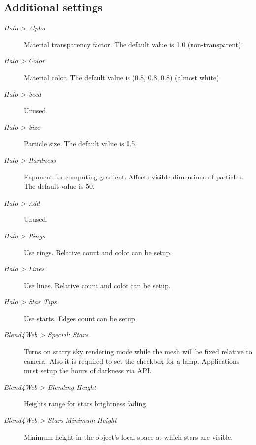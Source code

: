 \documentclass[a4paper,12pt,oneside]{sphinxmanual}
\begin{document}
\subsection{Additional settings}
\label{materials:id15}\begin{description}
\item[{\emph{Halo \textgreater{} Alpha}}] \leavevmode
Material transparency factor. The default value is 1.0 (non-transparent).

\item[{\emph{Halo \textgreater{} Color}}] \leavevmode
Material color. The default value is (0.8, 0.8, 0.8) (almost white).

\item[{\emph{Halo \textgreater{} Seed}}] \leavevmode
Unused.

\item[{\emph{Halo \textgreater{} Size}}] \leavevmode
Particle size. The default value is 0.5.

\item[{\emph{Halo \textgreater{} Hardness}}] \leavevmode
Exponent for computing gradient. Affects visible dimensions of particles. The default value is 50.

\item[{\emph{Halo \textgreater{} Add}}] \leavevmode
Unused.

\item[{\emph{Halo \textgreater{} Rings}}] \leavevmode
Use rings. Relative count and color can be setup.

\item[{\emph{Halo \textgreater{} Lines}}] \leavevmode
Use lines. Relative count and color can be setup.

\item[{\emph{Halo \textgreater{} Star Tips}}] \leavevmode
Use starts. Edges count can be setup.

\item[{\emph{Blend4Web \textgreater{} Special: Stars}}] \leavevmode
Turns on starry sky rendering mode while the mesh will be fixed relative to camera. Also it is required to set the  checkbox for a lamp. Applications must setup the hours of darkness via API.

\item[{\emph{Blend4Web \textgreater{} Blending Height}}] \leavevmode
Heights range for stars brightness fading.

\item[{\emph{Blend4Web \textgreater{} Stars Minimum Height}}] \leavevmode
Minimum height in the object's local space at which stars are visible.

\end{description}
\label{node_materials:node-materials}
\end{document}

